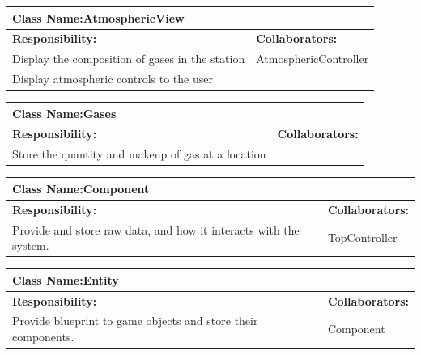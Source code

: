 \documentclass[]{article}
\begin{document}
	\begin{table}[ht]
		\centering
		\begin{tabular}{|p{5cm}|p{5cm}|}
		\hline 
		 \multicolumn{2}{|l|}{\textbf{Class Name:}AtmosphericView} \\
		\hline
		\textbf{Responsibility:} & \textbf{Collaborators:} \\
		\hline 
		Display the composition of gases in the station & AtmosphericController\\
		\hline
		Display atmospheric controls to the user & \\
		\hline
		\end{tabular}
	\end{table}
	\begin{table}[ht]
		\centering
		\begin{tabular}{|p{5cm}|p{5cm}|}
		\hline 
		 \multicolumn{2}{|l|}{\textbf{Class Name:}Gases} \\
		\hline
		\textbf{Responsibility:} & \textbf{Collaborators:} \\
		\hline 
		Store the quantity and makeup of gas at a location & \\
		\hline
		\end{tabular}
	\end{table}
	\begin{table}[ht]
		\centering
		\begin{tabular}{|p{5cm}|p{5cm}|}
		\hline 
		 \multicolumn{2}{|l|}{\textbf{Class Name:}Component} \\
		\hline
		\textbf{Responsibility:} & \textbf{Collaborators:} \\
		\hline 
		Provide and store raw data, and how it interacts with the system. & TopController \\
		\hline
		\end{tabular}
	\end{table}
	\begin{table}[ht]
		\centering
		\begin{tabular}{|p{5cm}|p{5cm}|}
		\hline 
		 \multicolumn{2}{|l|}{\textbf{Class Name:}Entity} \\
		\hline
		\textbf{Responsibility:} & \textbf{Collaborators:} \\
		\hline 
		Provide blueprint to game objects and store their components. & Component \\
		\hline
		\end{tabular}
	\end{table}


\appendix
\end{document}
